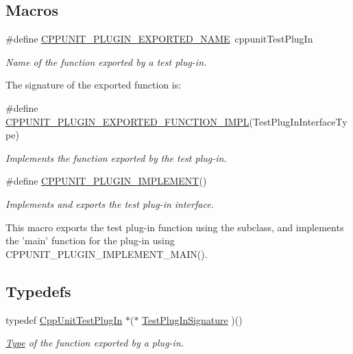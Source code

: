\subsection*{Macros}
\begin{DoxyCompactItemize}
\item 
\#define \hyperlink{group___writing_test_plug_in_gae7a1d474c7762e1bed3972b3d8fc11d6}{C\+P\+P\+U\+N\+I\+T\+\_\+\+P\+L\+U\+G\+I\+N\+\_\+\+E\+X\+P\+O\+R\+T\+E\+D\+\_\+\+N\+A\+M\+E}~cppunit\+Test\+Plug\+In
\begin{DoxyCompactList}\small\item\em Name of the function exported by a test plug-\/in.

The signature of the exported function is\+: \end{DoxyCompactList}\item 
\#define \hyperlink{group___writing_test_plug_in_ga81bfba0323e2c7ca7dfd6767db813a5b}{C\+P\+P\+U\+N\+I\+T\+\_\+\+P\+L\+U\+G\+I\+N\+\_\+\+E\+X\+P\+O\+R\+T\+E\+D\+\_\+\+F\+U\+N\+C\+T\+I\+O\+N\+\_\+\+I\+M\+P\+L}(Test\+Plug\+In\+Interface\+Type)
\begin{DoxyCompactList}\small\item\em Implements the function exported by the test plug-\/in. \end{DoxyCompactList}\item 
\#define \hyperlink{group___writing_test_plug_in_ga705897c323d9381ac1b99a45e953e4ff}{C\+P\+P\+U\+N\+I\+T\+\_\+\+P\+L\+U\+G\+I\+N\+\_\+\+I\+M\+P\+L\+E\+M\+E\+N\+T}()
\begin{DoxyCompactList}\small\item\em Implements and exports the test plug-\/in interface.

This macro exports the test plug-\/in function using the subclass, and implements the 'main' function for the plug-\/in using C\+P\+P\+U\+N\+I\+T\+\_\+\+P\+L\+U\+G\+I\+N\+\_\+\+I\+M\+P\+L\+E\+M\+E\+N\+T\+\_\+\+M\+A\+I\+N(). \end{DoxyCompactList}\end{DoxyCompactItemize}
\subsection*{Typedefs}
\begin{DoxyCompactItemize}
\item 
\hypertarget{group___writing_test_plug_in_gac6d885a430c48cf8b0a4534e8806c657}{typedef \hyperlink{struct_cpp_unit_test_plug_in}{Cpp\+Unit\+Test\+Plug\+In} $\ast$($\ast$ \hyperlink{group___writing_test_plug_in_gac6d885a430c48cf8b0a4534e8806c657}{Test\+Plug\+In\+Signature} )()}\label{group___writing_test_plug_in_gac6d885a430c48cf8b0a4534e8806c657}

\begin{DoxyCompactList}\small\item\em \hyperlink{struct_type}{Type} of the function exported by a plug-\/in. \end{DoxyCompactList}\end{DoxyCompactItemize}
